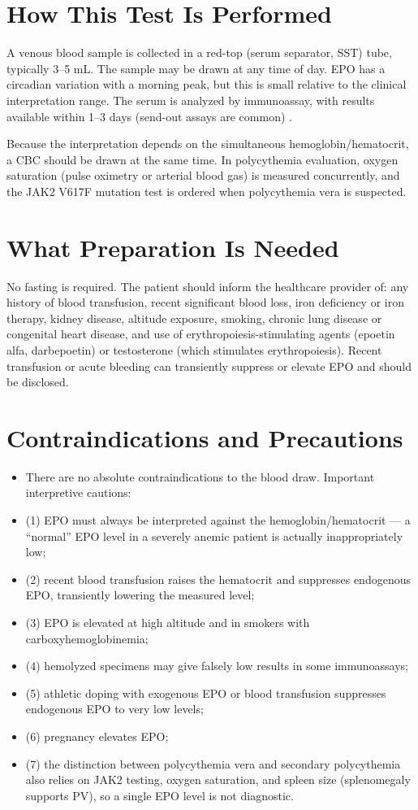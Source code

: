 \section*{How This Test Is Performed}
A venous blood sample is collected in a red-top (serum separator, SST) tube, typically 3--5 mL. The sample may be drawn at any time of day. EPO has a circadian variation with a morning peak, but this is small relative to the clinical interpretation range. The serum is analyzed by immunoassay, with results available within 1--3 days (send-out assays are common) \cite{fischbach2023manual}.

Because the interpretation depends on the simultaneous hemoglobin/hematocrit, a CBC should be drawn at the same time. In polycythemia evaluation, oxygen saturation (pulse oximetry or arterial blood gas) is measured concurrently, and the JAK2 V617F mutation test is ordered when polycythemia vera is suspected.

\section*{What Preparation Is Needed}
No fasting is required. The patient should inform the healthcare provider of: any history of blood transfusion, recent significant blood loss, iron deficiency or iron therapy, kidney disease, altitude exposure, smoking, chronic lung disease or congenital heart disease, and use of erythropoiesis-stimulating agents (epoetin alfa, darbepoetin) or testosterone (which stimulates erythropoiesis). Recent transfusion or acute bleeding can transiently suppress or elevate EPO and should be disclosed.

\section*{Contraindications and Precautions}
\begin{itemize}
  \item There are no absolute contraindications to the blood draw. Important interpretive cautions:
  \item (1) EPO must always be interpreted against the hemoglobin/hematocrit --- a ``normal'' EPO level in a severely anemic patient is actually inappropriately low;
  \item (2) recent blood transfusion raises the hematocrit and suppresses endogenous EPO, transiently lowering the measured level;
  \item (3) EPO is elevated at high altitude and in smokers with carboxyhemoglobinemia;
  \item (4) hemolyzed specimens may give falsely low results in some immunoassays;
  \item (5) athletic doping with exogenous EPO or blood transfusion suppresses endogenous EPO to very low levels;
  \item (6) pregnancy elevates EPO;
  \item (7) the distinction between polycythemia vera and secondary polycythemia also relies on JAK2 testing, oxygen saturation, and spleen size (splenomegaly supports PV), so a single EPO level is not diagnostic.
\end{itemize}
